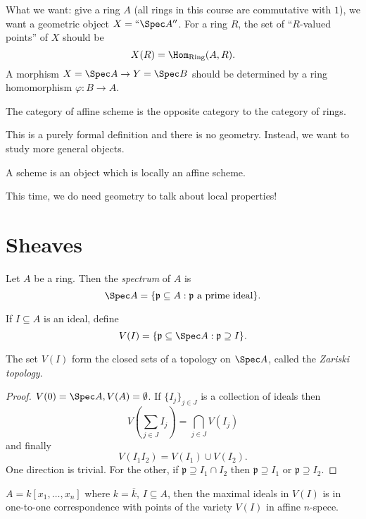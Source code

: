 \documentclass[a4paper]{article}
\begin{document}
What we want: give a ring \(A\) (all rings in this course are commutative with \(1\)), we want a geometric object \(X = ``\Spec A''\). For a ring \(R\), the set of ``\(R\)-valued points'' of \(X\) should be
\[
  X(R) = \Hom_{\text{Ring}}(A, R).
\]
A morphism \(X = \Spec A \to Y = \Spec B\) should be determined by a ring homomorphism \(\varphi: B \to A\).

\begin{definition}
  The category of affine scheme is the opposite category to the category of rings.
\end{definition}
This is a purely formal definition and there is no geometry. Instead, we want to study more general objects.

\begin{definition}
  A scheme is an object which is locally an affine scheme.
\end{definition}
This time, we do need geometry to talk about local properties!

\section{Sheaves}

\begin{definition}[spectrum]
  Let \(A\) be a ring. Then the \emph{spectrum} of \(A\) is
  \[
    \Spec A = \{\mathfrak p \subseteq A: \mathfrak p \text{ a prime ideal}\}.
  \]

  If \(I \subseteq A\) is an ideal, define
  \[
    V(I) = \{\mathfrak p \subseteq \Spec A: \mathfrak p \supseteq I\}.
  \]
\end{definition}

\begin{proposition}
  The set \(V(I)\) form the closed sets of a topology on \(\Spec A\), called the \emph{Zariski topology}.
\end{proposition}

\begin{proof}
  \(V(0) = \Spec A, V(A) = \emptyset\). If \(\{I_j\}_{j \in J}\) is a collection of ideals then
  \[
    V(\sum_{j \in J} I_j) = \bigcap_{j \in J} V(I_j)
  \]
  and finally
  \[
    V(I_1 I_2) = V(I_1) \cup V(I_2).
  \]
  One direction is trivial. For the other, if \(\mathfrak p \supseteq I_1 \cap I_2\) then \(\mathfrak p \supseteq I_1\) or \(\mathfrak p \supseteq I_2\).
\end{proof}

\begin{eg}
  \(A = k[x_1, \dots, x_n]\) where \(k = \overline k\), \(I \subseteq A\), then the maximal ideals in \(V(I)\) is in one-to-one correspondence with points of the variety \(V(I)\) in affine \(n\)-spece.
\end{eg}
\end{document}
